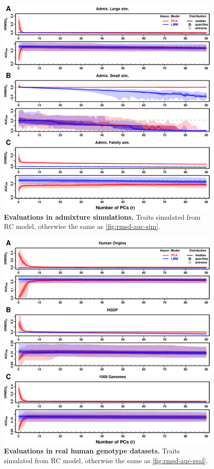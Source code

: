 \documentclass[11pt]{article}
\begin{document}
\begin{figure}[hp!]
  \centering
  \includegraphics[width=\textwidth,height=\textheight,keepaspectratio]{rmsd-auc-sim.pdf}
  \caption{
    {\small 
      {\bf Evaluations in admixture simulations.}
      Traits simulated from RC model, otherwise the same as \cref{fig:rmsd-auc-sim}.
    }
  }
  \label{fig:rmsd-auc-sim-rc}
\end{figure}

\begin{figure}[hp!]
  \centering
  \includegraphics[width=\textwidth,height=\textheight,keepaspectratio]{rmsd-auc-real.pdf}
  \caption{
    {\small 
      {\bf Evaluations in real human genotype datasets.}
      Traits simulated from RC model, otherwise the same as \cref{fig:rmsd-auc-real}.
    }
  }
  \label{fig:rmsd-auc-real-rc}
\end{figure}
\end{document}
